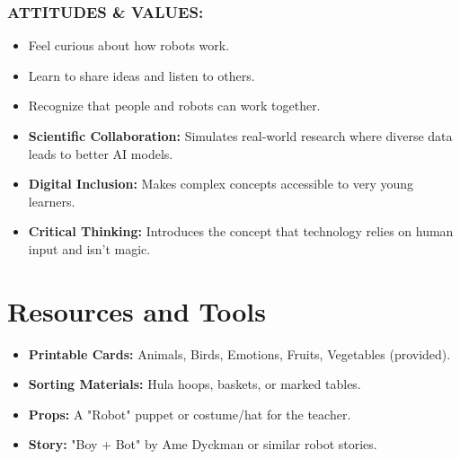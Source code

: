\documentclass[11pt, a4paper]{article}
\begin{document}
\subsubsection*{ATTITUDES \& VALUES:}
\begin{itemize}
    \item Feel curious about how robots work.
    \item Learn to share ideas and listen to others.
    \item Recognize that people and robots can work together.
\end{itemize}

\begin{eurobox}
\begin{itemize}
    \item \textbf{Scientific Collaboration:} Simulates real-world research where diverse data leads to better AI models.
    \item \textbf{Digital Inclusion:} Makes complex concepts accessible to very young learners.
    \item \textbf{Critical Thinking:} Introduces the concept that technology relies on human input and isn't magic.
\end{itemize}
\end{eurobox}

\newpage
\section{Resources and Tools}
\begin{itemize}
    \item \textbf{Printable Cards:} Animals, Birds, Emotions, Fruits, Vegetables (provided).
    \item \textbf{Sorting Materials:} Hula hoops, baskets, or marked tables.
    \item \textbf{Props:} A "Robot" puppet or costume/hat for the teacher.
    \item \textbf{Story:} "Boy + Bot" by Ame Dyckman or similar robot stories.
\end{itemize}
\end{document}
